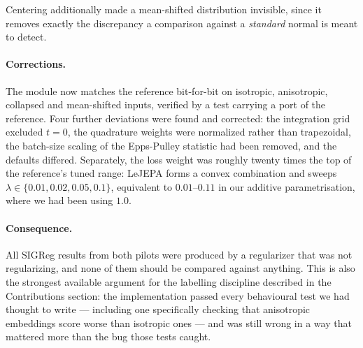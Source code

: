 Centering additionally made a mean-shifted distribution invisible, since it removes exactly
the discrepancy a comparison against a \emph{standard} normal is meant to detect.

\paragraph{Corrections.} The module now matches the reference bit-for-bit on isotropic,
anisotropic, collapsed and mean-shifted inputs, verified by a test carrying a port of the
reference. Four further deviations were found and corrected: the integration grid excluded
$t=0$, the quadrature weights were normalized rather than trapezoidal, the batch-size
scaling of the Epps-Pulley statistic had been removed, and the defaults differed. Separately,
the loss weight was roughly twenty times the top of the reference's tuned range: LeJEPA
forms a convex combination and sweeps $\lambda \in \{0.01, 0.02, 0.05, 0.1\}$, equivalent to
$0.01$--$0.11$ in our additive parametrisation, where we had been using $1.0$.

\paragraph{Consequence.} \interp{} All SIGReg results from both pilots were produced by a
regularizer that was not regularizing, and none of them should be compared against anything.
This is also the strongest available argument for the labelling discipline described in
the Contributions section: the implementation passed every behavioural
test we had thought to write --- including one specifically checking that anisotropic
embeddings score worse than isotropic ones --- and was still wrong in a way that mattered
more than the bug those tests caught.
